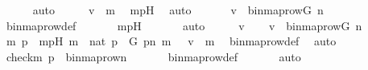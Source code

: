 \begin{isabellebody}
\ \ \ \ \isamarkupfalse%
\ auto\isanewline
\ \ \isamarkupfalse%
\ \isamarkupfalse%
\ {\isachardoublequoteopen}v\ {\isacharequal}{\kern0pt}\ m{\isachardoublequoteclose}\ \isamarkupfalse%
\ mpH\ \isamarkupfalse%
\ auto\ \isanewline
\ \ \isamarkupfalse%
\ \isamarkupfalse%
\ {\isachardoublequoteopen}v\ {\isasymin}\ binmap{\isacharunderscore}{\kern0pt}row{\isacharparenleft}{\kern0pt}G{\isacharcomma}{\kern0pt}\ n{\isacharparenright}{\kern0pt}{\isachardoublequoteclose}\ \isanewline
\ \ \ \ \isamarkupfalse%
\ binmap{\isacharunderscore}{\kern0pt}row{\isacharunderscore}{\kern0pt}def\ \isanewline
\ \ \ \ \isamarkupfalse%
\ mpH\ \isanewline
\ \ \ \ \isamarkupfalse%
\ auto\isanewline
{}\isamarkupfalse%
\ \isanewline
\ \ \isamarkupfalse%
\ v\isanewline
\ \ \isamarkupfalse%
\ {\isachardoublequoteopen}v\ {\isasymin}\ binmap{\isacharunderscore}{\kern0pt}row{\isacharparenleft}{\kern0pt}G{\isacharcomma}{\kern0pt}\ n{\isacharparenright}{\kern0pt}{\isachardoublequoteclose}\ \isanewline
\ \ \isamarkupfalse%
\ \isamarkupfalse%
\ m\ p\ \ mpH{\isacharcolon}{\kern0pt}\ {\isachardoublequoteopen}m\ {\isasymin}\ nat{\isachardoublequoteclose}\ {\isachardoublequoteopen}p\ {\isasymin}\ G{\isachardoublequoteclose}\ {\isachardoublequoteopen}p{\isacharbackquote}{\kern0pt}{\isacharless}{\kern0pt}n{\isacharcomma}{\kern0pt}\ m{\isachargreater}{\kern0pt}\ {\isacharequal}{\kern0pt}\ {}{\isachardoublequoteclose}\ {\isachardoublequoteopen}v\ {\isacharequal}{\kern0pt}\ m{\isachardoublequoteclose}\ \isamarkupfalse%
\ binmap{\isacharunderscore}{\kern0pt}row{\isacharunderscore}{\kern0pt}def\ \isamarkupfalse%
\ auto\isanewline
\ \ \isamarkupfalse%
\ \isamarkupfalse%
\ {\isachardoublequoteopen}{\isacharless}{\kern0pt}check{\isacharparenleft}{\kern0pt}m{\isacharparenright}{\kern0pt}{\isacharcomma}{\kern0pt}\ p{\isachargreater}{\kern0pt}\ {\isasymin}\ binmap{\isacharunderscore}{\kern0pt}row{\isacharprime}{\kern0pt}{\isacharparenleft}{\kern0pt}n{\isacharparenright}{\kern0pt}{\isachardoublequoteclose}\ \isanewline
\ \ \ \ \isamarkupfalse%
\ binmap{\isacharunderscore}{\kern0pt}row{\isacharprime}{\kern0pt}{\isacharunderscore}{\kern0pt}def\ \isanewline
\ \ \ \ \isamarkupfalse%
\ auto\isanewline
\ \ \ \ \ \ \isamarkupfalse%

\end{isabellebody}
